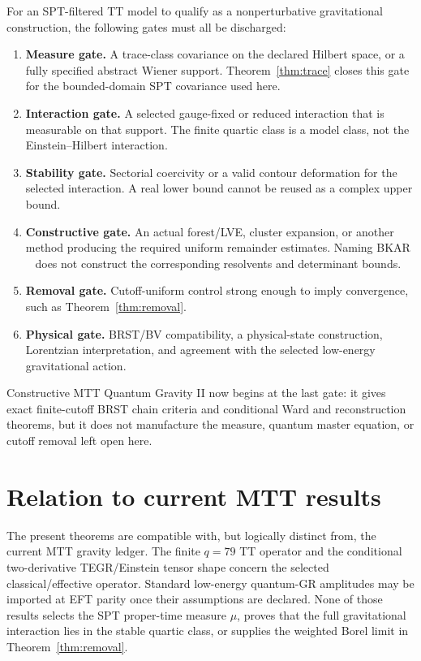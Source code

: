 \documentclass[11pt]{article}
\begin{document}
For an SPT-filtered TT model to qualify as a nonperturbative gravitational
construction, the following gates must all be discharged:
\begin{enumerate}
\item \textbf{Measure gate.} A trace-class covariance on the declared Hilbert space,
or a fully specified abstract Wiener support. Theorem~\ref{thm:trace} closes this
gate for the bounded-domain SPT covariance used here.
\item \textbf{Interaction gate.} A selected gauge-fixed or reduced interaction that
is measurable on that support. The finite quartic class is a model class, not the
Einstein--Hilbert interaction.
\item \textbf{Stability gate.} Sectorial coercivity or a valid contour deformation
for the selected interaction. A real lower bound cannot be reused as a complex
upper bound.
\item \textbf{Constructive gate.} An actual forest/LVE, cluster expansion, or another
method producing the required uniform remainder estimates. Naming BKAR
~\cite{BK1987,AR1995} does not construct the corresponding resolvents and
determinant bounds.
\item \textbf{Removal gate.} Cutoff-uniform control strong enough to imply convergence,
such as Theorem~\ref{thm:removal}.
\item \textbf{Physical gate.} BRST/BV compatibility, a physical-state construction,
Lorentzian interpretation, and agreement with the selected low-energy gravitational
action.
\end{enumerate}

Constructive MTT Quantum Gravity II now begins at the last gate: it gives exact
finite-cutoff BRST chain criteria and conditional Ward and reconstruction theorems,
but it does not manufacture the measure, quantum master equation, or cutoff removal
left open here.

\section{Relation to current MTT results}

The present theorems are compatible with, but logically distinct from, the current
MTT gravity ledger. The finite $q=79$ TT operator and the conditional two-derivative
TEGR/Einstein tensor shape concern the selected classical/effective operator. Standard
low-energy quantum-GR amplitudes may be imported at EFT parity once their assumptions
are declared. None of those results selects the SPT proper-time measure $\mu$, proves
that the full gravitational interaction lies in the stable quartic class, or supplies
the weighted Borel limit in Theorem~\ref{thm:removal}.
\end{document}
